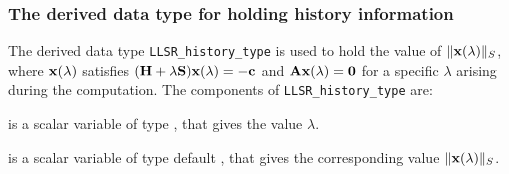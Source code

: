 \documentclass{galahad}
\newcommand{\packagename}{LLSR}
\begin{document}

\subsubsection{The derived data type for holding history
 information}\label{typehist}
The derived data type
{\tt \packagename\_history\_type}
is used to hold the value of $\|{\mathbf{x}}(\lambda)\|_S$, where
${\mathbf{x}}(\lambda)$ satisfies
$({\mathbf{H}} + \lambda {\mathbf{S}}){\mathbf{x}}(\lambda) = - {\mathbf{c}}$ and ${\mathbf{A}}{\mathbf{x}}(\lambda) = {\mathbf{0}}$
for a specific $\lambda$ arising during the computation.
The components of
{\tt \packagename\_history\_type}
are:
\begin{description}
 is a scalar variable of type \realdp, that gives
 the value $\lambda$.

 is a scalar variable of type default \real, that gives
 the corresponding value $\|{\mathbf{x}}(\lambda)\|_S$.

\end{description}

\end{document}
